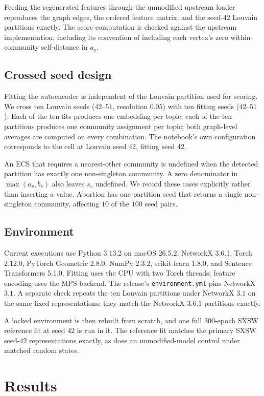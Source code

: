 Feeding the regenerated features through the unmodified upstream loader reproduces the graph edges, the ordered feature matrix, and the seed-$42$ Louvain partitions exactly. The score computation is checked against the upstream implementation, including its convention of including each vertex's zero within-community self-distance in $a_v$.

\subsection{Crossed seed design}

Fitting the autoencoder is independent of the Louvain partition used for scoring. We cross ten Louvain seeds ($42$--$51$, resolution $0.05$) with ten fitting seeds ($42$--$51$). Each of the ten fits produces one embedding per topic; each of the ten partitions produces one community assignment per topic; both graph-level averages are computed on every combination. The notebook's own configuration corresponds to the cell at Louvain seed $42$, fitting seed $42$.

An ECS that requires a nearest-other community is undefined when the detected partition has exactly one non-singleton community. A zero denominator in $\max(a_v,b_v)$ also leaves $s_v$ undefined. We record these cases explicitly rather than inserting a value. Abortion has one partition seed that returns a single non-singleton community, affecting $10$ of the $100$ seed pairs.

\subsection{Environment}

Current executions use Python 3.13.2 on macOS 26.5.2, NetworkX 3.6.1, Torch 2.12.0, PyTorch Geometric 2.8.0, NumPy 2.3.2, scikit-learn 1.8.0, and Sentence Transformers 5.1.0. Fitting uses the CPU with two Torch threads; feature encoding uses the MPS backend. The release's \texttt{environment.yml} pins NetworkX $3.1$. A separate check repeats the ten Louvain partitions under NetworkX $3.1$ on the same fixed representations; they match the NetworkX $3.6.1$ partitions exactly.

A locked environment is then rebuilt from scratch, and one full $300$-epoch SXSW reference fit at seed $42$ is run in it. The reference fit matches the primary SXSW seed-$42$ representations exactly, as does an unmodified-model control under matched random states.

\section{Results}
\label{sec:results}

